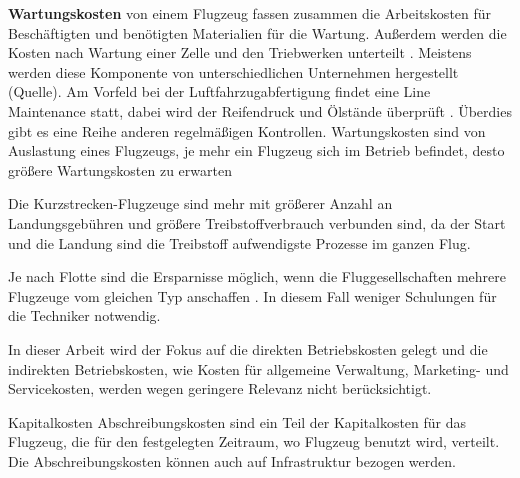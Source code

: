 \textbf{Wartungskosten} von einem Flugzeug fassen zusammen die Arbeitskosten für Beschäftigten und benötigten Materialien für die Wartung.
Außerdem werden die Kosten nach Wartung einer Zelle und den Triebwerken unterteilt \cite{wang2021research}. 
Meistens werden diese Komponente von unterschiedlichen
Unternehmen hergestellt (Quelle).
Am Vorfeld bei der Luftfahrzugabfertigung findet eine Line Maintenance statt, dabei wird der Reifendruck und Ölstände überprüft \cite{conrady2019luftverkehr}. 
Überdies gibt es eine Reihe anderen regelmäßigen Kontrollen.
Wartungskosten sind von Auslastung eines Flugzeugs, je mehr ein Flugzeug sich im Betrieb befindet, desto größere
Wartungskosten zu erwarten %

Die Kurzstrecken-Flugzeuge sind mehr mit größerer Anzahl an Landungsgebühren und größere Treibstoffverbrauch verbunden sind, da 
der Start und die Landung sind die Treibstoff aufwendigste Prozesse im ganzen Flug.

Je nach Flotte sind die Ersparnisse möglich, wenn die Fluggesellschaften mehrere Flugzeuge vom gleichen Typ anschaffen \cite{conrady2019luftverkehr}. 
In diesem Fall weniger Schulungen für die Techniker notwendig.


In dieser Arbeit wird der Fokus auf die direkten Betriebskosten gelegt und die indirekten Betriebskosten, wie Kosten für 
allgemeine Verwaltung, Marketing- und Servicekosten, werden wegen geringere Relevanz nicht berücksichtigt.



Kapitalkosten
Abschreibungskosten sind ein Teil der Kapitalkosten für das Flugzeug, die für den festgelegten Zeitraum, wo Flugzeug benutzt wird, verteilt.
Die Abschreibungskosten können auch auf Infrastruktur bezogen werden.




